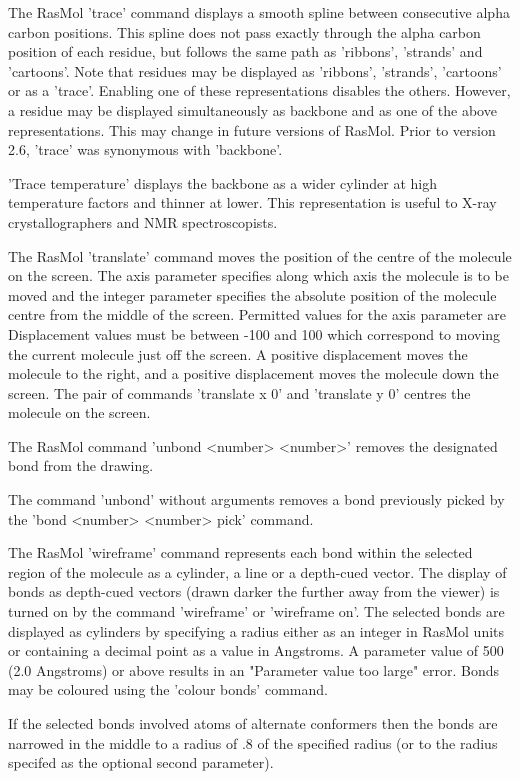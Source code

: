 The RasMol
'trace'
command displays a smooth spline between  consecutive alpha
carbon positions.  This spline does not pass exactly through
the alpha carbon position of each residue, but  follows the
same path as
'ribbons',
'strands'
and
'cartoons'.
Note that residues may be displayed as
'ribbons',
'strands',
'cartoons'
or as a
'trace'.
Enabling one of these
representations disables the others. However, a residue
may be displayed simultaneously as backbone and as one of
the above representations.  This may change in future
versions of RasMol.  Prior to version 2.6,
'trace'
was synonymous with
'backbone'.

'Trace temperature'
displays the backbone as a wider cylinder
at high temperature factors and thinner at lower.  This
representation is useful to X-ray crystallographers and NMR spectroscopists.

The RasMol
'translate'
command moves the position of the centre of the molecule on the
screen. The axis parameter specifies along which axis the molecule
is to be moved and the integer parameter specifies the absolute
position of the molecule centre from the middle of the screen.
Permitted values for the axis parameter are
Displacement values must be between -100 and 100 which correspond to
moving the current molecule just off the screen. A positive
displacement moves the molecule to the right, and a positive
displacement moves the molecule down the screen. The pair of commands
'translate x 0'
and
'translate y 0'
centres the molecule on the screen.

The RasMol command
'unbond <number> <number>'
removes the designated bond from the drawing.

The command
'unbond'
without arguments removes a bond previously picked by the
'bond <number> <number> pick'
command.

The RasMol
'wireframe'
command represents each bond within the selected region of the molecule
as a cylinder, a line or a depth-cued vector. The display of bonds
as depth-cued vectors (drawn darker the further away from the viewer)
is turned on by the command
'wireframe'
or
'wireframe on'.
The selected bonds are displayed as cylinders by specifying a radius
either as an integer in RasMol units or containing a decimal point as
a value in Angstroms.  A parameter value of 500 (2.0 Angstroms) or
above results in an "Parameter value too large" error. Bonds may be
coloured using the
'colour bonds'
command.

If the selected bonds involved atoms of alternate conformers then
the bonds are narrowed in the middle to a radius of .8 of the specified
radius (or to the radius specifed as the optional second parameter).

